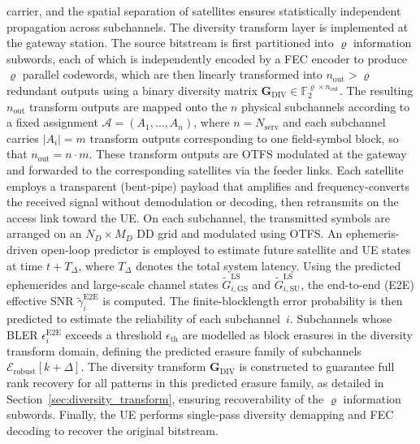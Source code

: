 \documentclass[journal]{IEEEtran}
\begin{document}
carrier, and the spatial separation of satellites ensures statistically 
independent propagation across subchannels. The diversity transform layer is implemented at the gateway station. The source bitstream is first partitioned into $\varrho$ information 
subwords, each of which is independently encoded by a FEC encoder to produce $\varrho$ parallel codewords, 
which are then linearly transformed into $n_{\text{out}} > \varrho$ 
redundant outputs using a binary diversity matrix 
$\mathbf{G}_{\mathrm{DIV}} \in \mathbb{F}_2^{\varrho \times n_{\text{out}}}$. The resulting $n_{\text{out}}$ transform outputs are mapped onto the $n$ physical subchannels according to a fixed assignment $\mathcal{A} = (A_1,\ldots,A_n)$, where $n = N_{\text{serv}}$ and each subchannel carries $|A_i| = m$ transform outputs corresponding to one field-symbol block, so that $n_{\text{out}} = n \cdot m$. These 
transform outputs are OTFS modulated at the gateway and forwarded to the corresponding satellites via the feeder links. Each satellite employs a 
transparent (bent-pipe) payload that amplifies and frequency-converts the 
received signal without demodulation or decoding, then retransmits on the access 
link toward the UE. On each subchannel, the transmitted symbols are arranged on an $N_D \times M_D$ DD grid and modulated using OTFS. An ephemeris-driven open-loop predictor is employed to estimate future 
satellite and UE states at time $t + T_{\Delta}$, where $T_{\Delta}$ 
denotes the total system latency. Using the predicted ephemerides and 
large-scale channel states $\tilde{G}_{i,\mathrm{GS}}^{\mathrm{LS}}$ and 
$\tilde{G}_{i,\mathrm{SU}}^{\mathrm{LS}}$, the end-to-end (E2E) effective SNR 
$\tilde{\gamma}_{i}^{\mathrm{E2E}}$ is computed. The finite-blocklength 
error probability is then predicted to estimate the reliability of each 
subchannel~$i$. Subchannels whose BLER $\epsilon_{i}^{\mathrm{E2E}}$ exceeds a threshold $\epsilon_{\mathrm{th}}$ are modelled as block erasures in the diversity transform domain, defining the predicted erasure family of subchannels $\mathcal{E}_{\mathrm{robust}}[k+\Delta]$. The 
diversity transform $\mathbf{G}_{\mathrm{DIV}}$ is constructed to 
guarantee full rank recovery for all patterns in this predicted erasure family, as detailed in Section~\ref{sec:diversity_transform}, ensuring 
recoverability of the $\varrho$ information subwords. Finally, the UE performs single‑pass diversity demapping and FEC decoding to recover the original bitstream.
\end{document}
